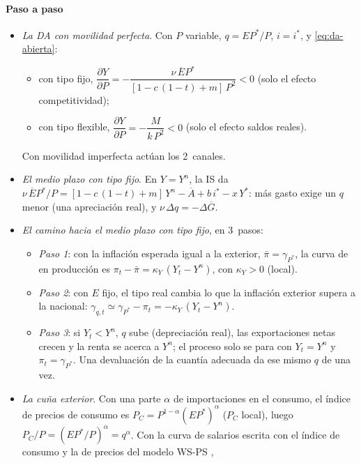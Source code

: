 \documentclass[11pt]{article}
\begin{document}
\paragraph{Paso a paso}

\begin{itemize}
\item \emph{La DA con movilidad perfecta}. Con $P$ variable, $q=EP^*/P$, $i=i^*$, y \eqref{eq:da-abierta}:
  \begin{itemize}
  \item con tipo fijo, $\dfrac{\partial Y}{\partial P}=-\dfrac{\nu\,\overline{E}P^*}{[1-c\,(1-t)+m]\,P^2}<0$ (solo el efecto competitividad);
  \item con tipo flexible, $\dfrac{\partial Y}{\partial P}=-\dfrac{M}{k\,P^2}<0$ (solo el efecto saldos reales).
  \end{itemize}
  Con movilidad imperfecta actúan los 2~canales.
\item \emph{El medio plazo con tipo fijo}. En $Y=Y^n$, la IS da $\nu\,\overline{E}P^*/P=[1-c\,(1-t)+m]\,Y^n-\overline{A}+b\,i^*-x\,Y^*$: más gasto exige un $q$ menor (una apreciación real), y $\nu\,\Delta q=-\Delta\overline{G}$.
\item \emph{El camino hacia el medio plazo con tipo fijo}, en 3~pasos\nocite{Blanchard2021Macroeconomics}:
  \begin{itemize}
  \item \emph{Paso 1}: con la inflación esperada igual a la exterior, $\bar\pi=\gamma_{P^*}$, la curva de  en producción es $\pi_t-\bar\pi=\kappa_Y\,(Y_t-Y^n)$, con $\kappa_Y>0$ (local).
  \item \emph{Paso 2}: con $E$ fijo, el tipo real cambia lo que la inflación exterior supera a la nacional: $\gamma_{q,t}\simeq\gamma_{P^*}-\pi_t=-\kappa_Y\,(Y_t-Y^n)$.
  \item \emph{Paso 3}: si $Y_t<Y^n$, $q$ sube (depreciación real), las exportaciones netas crecen y la renta se acerca a $Y^n$; el proceso solo se para con $Y_t=Y^n$ y $\pi_t=\gamma_{P^*}$. Una devaluación de la cuantía adecuada da ese mismo $q$ de una vez.
  \end{itemize}
\item \emph{La cuña exterior}. Con una parte $\alpha$ de importaciones en el consumo, el índice de precios de consumo es $P_C=P^{1-\alpha}(EP^*)^{\alpha}$ ($P_C$ local), luego $P_C/P=(EP^*/P)^{\alpha}=q^{\alpha}$. Con la curva de salarios escrita con el índice de consumo y la de precios del modelo WS-PS ,
  \begin{equation*}

\end{equation*}
\end{itemize}
\end{document}
